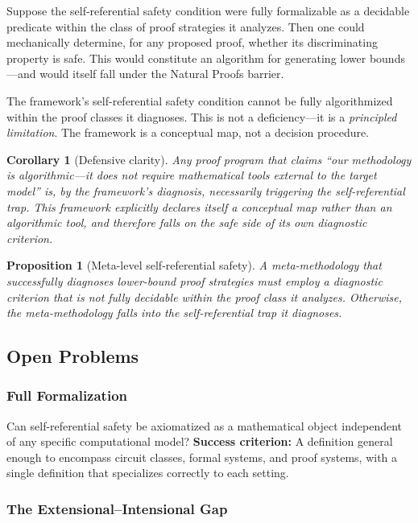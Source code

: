 \documentclass[11pt,a4paper]{article}
\theoremstyle{plain}
\newtheorem{proposition}[theorem]{Proposition}
\newtheorem{corollary}[theorem]{Corollary}
\theoremstyle{definition}
\theoremstyle{remark}
\begin{document}
Suppose the self-referential safety condition were fully formalizable as a decidable predicate within the class of proof strategies it analyzes. Then one could mechanically determine, for any proposed proof, whether its discriminating property is safe. This would constitute an algorithm for generating lower bounds---and would itself fall under the Natural Proofs barrier.

The framework's self-referential safety condition cannot be fully algorithmized within the proof classes it diagnoses. This is not a deficiency---it is a \emph{principled limitation}. The framework is a conceptual map, not a decision procedure.

\begin{corollary}[Defensive clarity]
Any proof program that claims ``our methodology is algorithmic---it does not require mathematical tools external to the target model'' is, by the framework's diagnosis, necessarily triggering the self-referential trap. This framework explicitly declares itself a conceptual map rather than an algorithmic tool, and therefore falls on the safe side of its own diagnostic criterion.
\end{corollary}

\begin{proposition}[Meta-level self-referential safety]
A meta-methodology that successfully diagnoses lower-bound proof strategies must employ a diagnostic criterion that is not fully decidable within the proof class it analyzes. Otherwise, the meta-methodology falls into the self-referential trap it diagnoses.
\end{proposition}

\subsection{Open Problems}

\subsubsection{Full Formalization}

Can self-referential safety be axiomatized as a mathematical object independent of any specific computational model? \textbf{Success criterion:} A definition general enough to encompass circuit classes, formal systems, and proof systems, with a single definition that specializes correctly to each setting.

\subsubsection{The Extensional--Intensional Gap}
\end{document}
